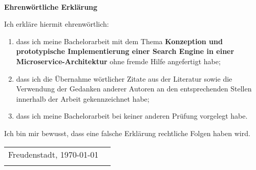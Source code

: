 
~

\vspace{17.1mm}

\begin{flushleft}
    \textbf{\huge{}Ehrenwörtliche Erklärung}{\huge\par}
\par\end{flushleft}

Ich erkläre hiermit ehrenwörtlich:

\begin{enumerate}
    \item dass ich meine Bachelorarbeit mit dem Thema \textbf{\glqq Konzeption und prototypische Implementierung einer Search Engine in einer Microservice-Architektur\grqq{}} ohne fremde Hilfe angefertigt habe;
    \item dass ich die Übernahme wörtlicher Zitate aus der Literatur sowie die Verwendung der Gedanken anderer Autoren an den entsprechenden Stellen innerhalb der Arbeit gekennzeichnet habe;
    \item dass ich meine Bachelorarbeit bei keiner anderen Prüfung vorgelegt habe.
\end{enumerate}

Ich bin mir bewusst, dass eine falsche Erklärung rechtliche Folgen haben wird.

\vspace{2cm}


\begin{center}
    \begin{tabular*}{\textwidth}{@{\extracolsep{\fill}}cl}
        Freudenstadt, \today
        \tabularnewline
        & \author{}
        \tabularnewline
    \end{tabular*}
    \par
\end{center}